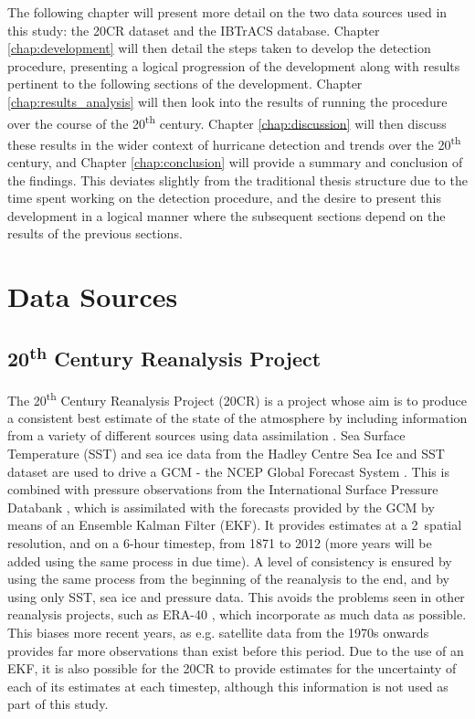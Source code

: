 \documentclass[pdftex,12pt,a4paper]{report}
\newcommand{\ts}{\textsuperscript}
\begin{document}
The following chapter will present more detail on the two data sources used in this study: the
20CR dataset and the IBTrACS database. Chapter \ref{chap:development} will then detail the steps
taken to develop the detection procedure, presenting a logical progression of the development along
with results pertinent to the following sections of the development. Chapter
\ref{chap:results_analysis} will then look into the results of running the procedure over the course
of the 20\ts{th} century. Chapter \ref{chap:discussion} will then discuss these results in the wider
context of hurricane detection and trends over the 20\ts{th} century, and Chapter
\ref{chap:conclusion} will provide a summary and conclusion of the findings. This deviates slightly
from the traditional thesis structure due to the time spent working on the detection procedure, and
the desire to present this development in a logical manner where the subsequent sections depend on
the results of the previous sections.

\chapter{Data Sources}

\section{20\ts{th} Century Reanalysis Project}
\label{sec:20crp}

The 20\ts{th} Century Reanalysis Project (20CR) is a project whose aim is to produce a consistent
best estimate of the state of the atmosphere by including information from a variety of different
sources using data assimilation \parencite{compoTwentieth2011}. Sea Surface Temperature (SST) and
sea ice data from the Hadley Centre Sea Ice and SST dataset \parencite{rayner2003} are used to drive
a GCM - the NCEP Global Forecast System \parencite{TODOCITE}. This is combined with pressure
observations from the International Surface Pressure Databank \parencite{TODOCITE}, which is
assimilated with the forecasts provided by the GCM by means of an Ensemble Kalman Filter (EKF). It
provides estimates at a 2\textdegree\ spatial resolution, and on a 6-hour timestep, from 1871 to 2012
(more years will be added using the same process in due time). A level of consistency is ensured by
using the same process from the beginning of the reanalysis to the end, and by using only SST, sea
ice and pressure data. This avoids the problems seen in other reanalysis projects, such as ERA-40
\parencite{TODOCITE}, which incorporate as much data as possible. This biases more recent years, as
e.g. satellite data from the 1970s onwards provides far more observations than exist before this
period. Due to the use of an EKF, it is also possible for the 20CR to provide estimates for the
uncertainty of each of its estimates at each timestep, although this information is not used as part
of this study.
\end{document}
